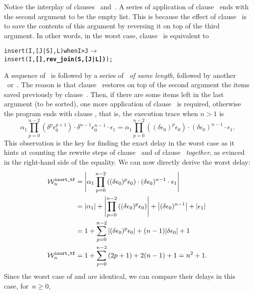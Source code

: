 Notice the interplay of clauses
\clause{\delta}~and~. A series of application
of clause~\clause{\delta} ends with the second argument to be the
empty list. This is because the effect of clause~\clause{\delta} is to
save the contents of this argument by reversing it on top of the third
argument. In other words, in the worst case, clause~\clause{\delta} is
equivalent to
\begin{alltt}
insert(I,[J|S],L) when I > J \(\rightarrow\)
\hfill insert(I,\textbf{[]},\textbf{rev_join(S,[J|L])});
\end{alltt}
A sequence of~\clause{\delta} is followed by a series
of~ \emph{of same length}, followed by another
~or~. The reason is that
clause~ restores on top of the second argument
the items saved previously by clause~\clause{\delta}. Then, if there
are some items left in the last argument (to be sorted), one more
application of clause~ is required, otherwise
the program ends with clause , that is, the
execution trace when \(n>1\) is
\[
\alpha_1\prod_{p=0}^{n-2}{\left(\delta^p\epsilon_0^{p+1}\right)} \cdot
\delta^{n-1}\epsilon_0^{n-1} \cdot \epsilon_1
= \alpha_1\prod_{p=0}^{n-2}{\left((\delta\epsilon_0)^p\epsilon_0\right)}
\cdot (\delta\epsilon_0)^{n-1} \cdot \epsilon_1.
\]
This observation is the key for finding the exact delay in the worst
case as it hints at counting the rewrite steps of
clause~\clause{\delta} and of clause~
\emph{together}, as evinced in the right\hyp{}hand side of the
equality. We can now directly derive the worst delay:
\begin{align*}
\worst{isort\_tf}{n}
  &= \left|\alpha_1\prod_{p=0}^{n-2}{\left((\delta\epsilon_0)^p\epsilon_0\right)}
     \cdot (\delta\epsilon_0)^{n-1} \cdot \epsilon_1\right|\\
  &= \abs{\alpha_1} +
     \left|\prod_{p=0}^{n-2}{\left((\delta\epsilon_0)^p\epsilon_0\right)}\right|
     + \left|(\delta\epsilon_0)^{n-1}\right| + \abs{\epsilon_1}\\
  &= 1 + \sum_{p=0}^{n-2}{\left|(\delta\epsilon_0)^p\epsilon_0\right|}
     + (n-1)\abs{\delta\epsilon_0} + 1\\
\worst{isort\_tf}{n}
  &= 1 + \sum_{p=0}^{n-2}{(2p+1)} + 2(n-1) + 1 = n^2 + 1.
\end{align*}
Since the worst case of  and
 are identical, we can compare their delays in this
case, for~\(n\geqslant{}0\),
